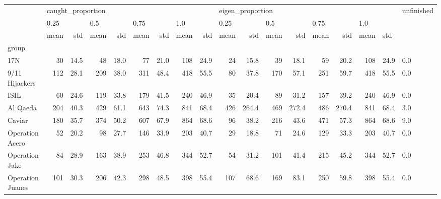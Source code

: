 \begin{tabular}{lrrrrrrrrrrrrrrrrl}
\toprule
{} & \multicolumn{8}{l}{caught\_proportion} & \multicolumn{8}{l}{eigen\_proportion} & unfinished \\
{} & \multicolumn{2}{l}{0.25} & \multicolumn{2}{l}{0.5} & \multicolumn{2}{l}{0.75} & \multicolumn{2}{l}{1.0} & \multicolumn{2}{l}{0.25} & \multicolumn{2}{l}{0.5} & \multicolumn{2}{l}{0.75} & \multicolumn{3}{l}{1.0} \\
{} &              mean &   std & mean &   std & mean &   std & mean &   std &             mean &    std & mean &    std & mean &    std & mean & \multicolumn{2}{l}{std} \\
group                &                   &       &      &       &      &       &      &       &                  &        &      &        &      &        &      &       &            \\
\midrule
17N                  &                30 &  14.5 &   48 &  18.0 &   77 &  21.0 &  108 &  24.9 &               24 &   15.8 &   39 &   18.1 &   59 &   20.2 &  108 &  24.9 &        0.0 \\
9/11 Hijackers       &               112 &  28.1 &  209 &  38.0 &  311 &  48.4 &  418 &  55.5 &               80 &   37.8 &  170 &   57.1 &  251 &   59.7 &  418 &  55.5 &        0.0 \\
ISIL                 &                60 &  24.6 &  119 &  33.8 &  179 &  41.5 &  240 &  46.9 &               35 &   20.4 &   89 &   31.2 &  157 &   39.2 &  240 &  46.9 &        0.0 \\
Al Qaeda             &               204 &  40.3 &  429 &  61.1 &  643 &  74.3 &  841 &  68.4 &              426 &  264.4 &  469 &  272.4 &  486 &  270.4 &  841 &  68.4 &        3.0 \\
Caviar               &               180 &  35.7 &  374 &  50.2 &  607 &  67.9 &  864 &  68.6 &               96 &   38.2 &  216 &   43.6 &  471 &   57.3 &  864 &  68.6 &        9.0 \\
Operation Acero      &                52 &  20.2 &   98 &  27.7 &  146 &  33.9 &  203 &  40.7 &               29 &   18.8 &   71 &   24.6 &  129 &   33.3 &  203 &  40.7 &        0.0 \\
Operation Jake       &                84 &  28.9 &  163 &  38.9 &  253 &  46.8 &  344 &  52.7 &               54 &   31.2 &  101 &   41.4 &  215 &   45.2 &  344 &  52.7 &        0.0 \\
Operation Juanes     &               101 &  30.3 &  206 &  42.3 &  298 &  48.5 &  398 &  55.4 &              107 &   68.6 &  169 &   83.1 &  250 &   59.8 &  398 &  55.4 &        0.0 \\

\end{tabular}

